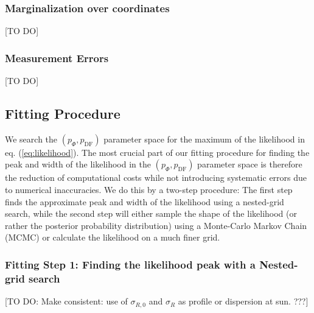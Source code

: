 \documentclass[12pt,preprint]{aastex}
\begin{document}


\subsubsection{Marginalization over coordinates}
[TO DO]

\subsubsection{Measurement Errors}

[TO DO]

\subsection{Fitting Procedure}

We search the $(p_\Phi,p_\text{DF})$ parameter space for the maximum of the likelihood in eq. (\ref{eq:likelihood}). The most crucial part of our fitting procedure for finding the peak and width of the likelihood in the $(p_\Phi,p_\text{DF})$ parameter space  is therefore the reduction of computational costs while not introducing systematic errors due to numerical inaccuracies. We do this by a two-step procedure: The first step finds the approximate peak and width of the likelihood using a nested-grid search, while the second step will either sample the shape of the likelihood (or rather the posterior probability distribution) using a Monte-Carlo Markov Chain (MCMC) or calculate the likelihood on a much finer grid.

\subsubsection{Fitting Step 1: Finding the likelihood peak with a Nested-grid search}

[TO DO: Make consistent: use of $\sigma_{R,0}$ and $\sigma_R$ as profile or dispersion at sun. ???]
\end{document}
